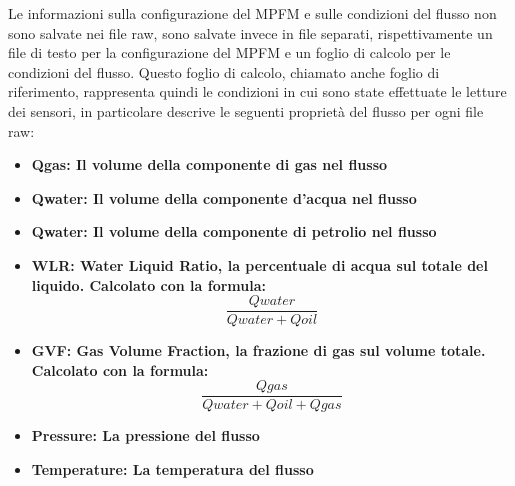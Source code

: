 Le informazioni sulla configurazione del MPFM e sulle condizioni del flusso non sono salvate nei file raw, sono salvate invece in file separati, rispettivamente un file di testo per la configurazione del MPFM e un foglio di calcolo per le condizioni del flusso. Questo foglio di calcolo, chiamato anche foglio di riferimento, rappresenta quindi le condizioni in cui sono state effettuate le letture dei sensori, in particolare descrive le seguenti proprietà del flusso per ogni file raw:

\begin{itemize}
	\item \bfseries{Qgas}: Il volume della componente di gas nel flusso
	\item \bfseries{Qwater}: Il volume della componente d'acqua nel flusso
	\item \bfseries{Qwater}: Il volume della componente di petrolio nel flusso
	\item \bfseries{WLR}: Water Liquid Ratio, la percentuale di acqua sul totale del liquido. Calcolato con la formula: \[\frac{Qwater}{Qwater+Qoil}\]
	\item \bfseries{GVF}: Gas Volume Fraction, la frazione di gas sul volume totale. Calcolato con la formula: \[\frac{Qgas}{Qwater+Qoil+Qgas}\]
	\item \bfseries{Pressure}: La pressione del flusso
	\item \bfseries{Temperature}: La temperatura del flusso
\end{itemize}




